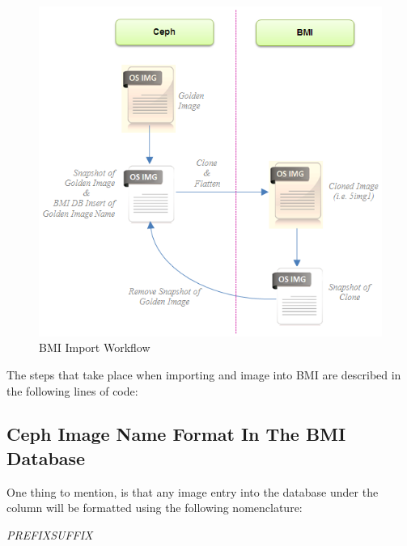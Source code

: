 \begin{figure}[!h] %
\label{fig:bmi-workflow-import}
\begin{center}
\includegraphics[scale=1]{figures/workflow-bmi-import-v2.png}
\end{center}
\caption{BMI Import Workflow}
\end{figure}

\pagebreak

The steps that take place when importing and image into BMI are described in the following lines of code:

\begin{center}
\end{center}


\subsection{Ceph Image Name Format In The BMI Database}

One thing to mention, is that any image entry into the database under the  column will be formatted using the following nomenclature: 

\begin{center}
\emph{\color{gray}PREFIX}\emph{\color{gray}SUFFIX} 
\end{center}

